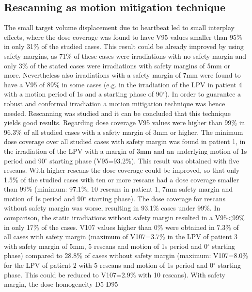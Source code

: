 \newpage

\subsection{Rescanning as motion mitigation technique}

The small target volume displacement due to heartbeat led to small interplay effects, where the dose coverage was found 
to have V95 values smaller than 95\% in only 31\% of the studied cases. This result could be already improved by using safety margins, as 
71\% of these cases were irradiations with no safety margin and only 3\% of the stated cases were irradiations with safety margins of 
5mm or more. Nevertheless also irradiations with a safety margin of 7mm were found to have a V95 of 89\% in some cases (e.g. 
in the irradiation of the LPV in patient 4 with a motion period of 1s and a starting phase of 90$^{\circ}$). In order to 
guarantee a robust and conformal irradiation a motion mitigation technique was hence needed. Rescanning was studied 
and it can be concluded that this technique yields good results. \newline
\newline
Regarding dose coverage V95 values were higher than 99\% in 96.3\% of all studied cases with a safety margin of 3mm or higher. 
The minimum dose coverage over all studied cases with safety margin was found in patient 1, in the irradiation of the LPV with a margin 
of 3mm and an underlying motion of 1s period and 90$^{\circ}$ starting phase (V95=93.2\%). This result was obtained with five rescans. 
With higher rescans the dose coverage could be improved, so that only 1.5\% of the studied cases with ten or more rescans had a dose coverage 
smaller than 99\% (minimum: 97.1\%; 10 rescans in patient 1, 7mm safety margin and motion of 1s period and 90$^{\circ}$ starting phase). 
The dose coverage for rescans without safety margin was worse, resulting in 93.1\% cases under 99\%. In comparison, the static irradiations 
without safety margin resulted in a V95<99\% in only 17\% of the cases. 
V107 values higher than 0\% were obtained in 7.3\% of all cases with safety margin (maximum of V107=3.7\% in the LPV of patient 3 
with safety margin of 5mm, 5 rescans and motion of 1s period and 0$^{\circ}$ starting phase) compared to 
28.8\% of cases without safety margin (maximum: V107=8.0\% for the LPV of patient 2 with 5 rescans and motion of 1s period 
and 0$^{\circ}$ starting phase. This could be reduced to V107=2.9\% with 10 rescans). With safety margin, the dose homogeneity D5-D95 
